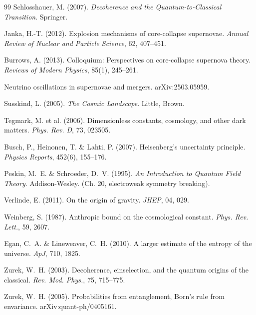\documentclass[12pt,a4paper]{article}
\theoremstyle{remark}
\begin{document}
\begin{thebibliography}{99}
Schlosshauer, M. (2007).
\newblock \textit{Decoherence and the Quantum-to-Classical Transition}.
\newblock Springer.

Janka, H.-T. (2012).
\newblock Explosion mechanisms of core-collapse supernovae.
\newblock \textit{Annual Review of Nuclear and Particle Science}, 62, 407--451.

Burrows, A. (2013).
\newblock Colloquium: Perspectives on core-collapse supernova theory.
\newblock \textit{Reviews of Modern Physics}, 85(1), 245--261.

Neutrino oscillations in supernovae and mergers.
\newblock arXiv:2503.05959.

Susskind, L. (2005).
\newblock \textit{The Cosmic Landscape}.
\newblock Little, Brown.

Tegmark, M. et al. (2006).
\newblock Dimensionless constants, cosmology, and other dark matters.
\newblock \textit{Phys. Rev. D}, 73, 023505.

Busch, P., Heinonen, T. \& Lahti, P. (2007).
\newblock Heisenberg's uncertainty principle.
\newblock \textit{Physics Reports}, 452(6), 155--176.

Peskin, M.~E. \& Schroeder, D.~V. (1995).
\newblock \textit{An Introduction to Quantum Field Theory}.
\newblock Addison-Wesley. (Ch. 20, electroweak symmetry breaking).

Verlinde, E. (2011).
\newblock On the origin of gravity.
\newblock \textit{JHEP}, 04, 029.

Weinberg, S. (1987).
\newblock Anthropic bound on the cosmological constant.
\newblock \textit{Phys. Rev. Lett.}, 59, 2607.

Egan, C.~A. \& Lineweaver, C.~H. (2010).
\newblock A larger estimate of the entropy of the universe.
\newblock \textit{ApJ}, 710, 1825.

Zurek, W.~H. (2003).
\newblock Decoherence, einselection, and the quantum origins of the classical.
\newblock \textit{Rev. Mod. Phys.}, 75, 715--775.

Zurek, W.~H. (2005).
\newblock Probabilities from entanglement, Born's rule from envariance.
\newblock arXiv:quant-ph/0405161.


\end{thebibliography}
\end{document}
